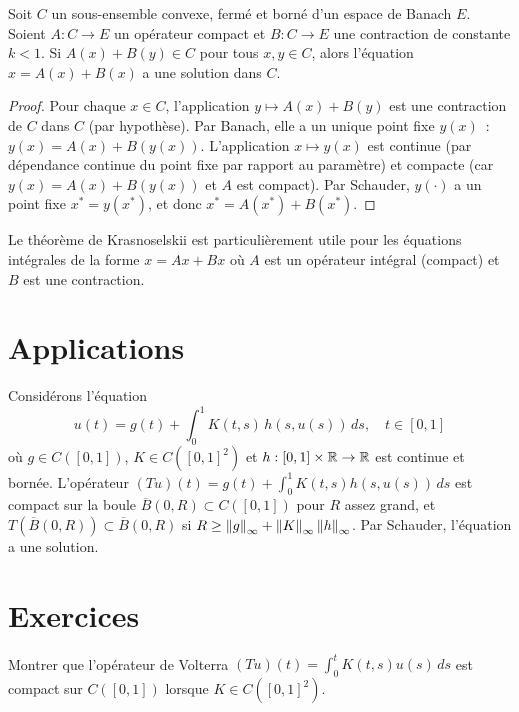 \begin{theoreme}[Krasnoselskii, 1958]\label{thm:krasnoselskii}
Soit $C$ un sous-ensemble convexe, ferm\'e et born\'e d'un espace de Banach $E$.
Soient $A : C \to E$ un op\'erateur compact et $B : C \to E$ une contraction
de constante $k < 1$. Si $A(x) + B(y) \in C$ pour tous $x, y \in C$, alors
l'\'equation $x = A(x) + B(x)$ a une solution dans $C$.
\end{theoreme}

\begin{proof}
Pour chaque $x \in C$, l'application $y \mapsto A(x) + B(y)$ est une contraction
de $C$ dans $C$ (par hypoth\`ese). Par Banach, elle a un unique point fixe
$y(x)$~: $y(x) = A(x) + B(y(x))$. L'application $x \mapsto y(x)$ est continue
(par d\'ependance continue du point fixe par rapport au param\`etre) et compacte
(car $y(x) = A(x) + B(y(x))$ et $A$ est compact). Par Schauder, $y(\cdot)$ a
un point fixe $x^* = y(x^*)$, et donc $x^* = A(x^*) + B(x^*)$.
\end{proof}

\begin{remarque}
Le th\'eor\`eme de Krasnoselskii est particuli\`erement utile pour les \'equations
int\'egrales de la forme $x = Ax + Bx$ o\`u $A$ est un op\'erateur int\'egral
(compact) et $B$ est une contraction.
\end{remarque}

\section{Applications}

\begin{exemple}
Consid\'erons l'\'equation
\[
    u(t) = g(t) + \int_0^1 K(t,s) \, h(s, u(s)) \, ds, \quad t \in [0,1]
\]
o\`u $g \in C([0,1])$, $K \in C([0,1]^2)$ et $h : [0,1] \times \mathbb{R} \to \mathbb{R}$ est
continue et born\'ee. L'op\'erateur
$(Tu)(t) = g(t) + \int_0^1 K(t,s) h(s, u(s)) \, ds$ est compact sur la boule
$\overline{B}(0, R) \subset C([0,1])$ pour $R$ assez grand, et
$T(\overline{B}(0,R)) \subset \overline{B}(0,R)$ si $R \geq \left\| g \right\|_\infty +
\left\| K \right\|_\infty \left\| h \right\|_\infty$. Par Schauder, l'\'equation a une solution.
\end{exemple}

\section{Exercices}

\begin{exercice}
Montrer que l'op\'erateur de Volterra $(Tu)(t) = \int_0^t K(t,s) u(s) \, ds$
est compact sur $C([0,1])$ lorsque $K \in C([0,1]^2)$.
\end{exercice}

